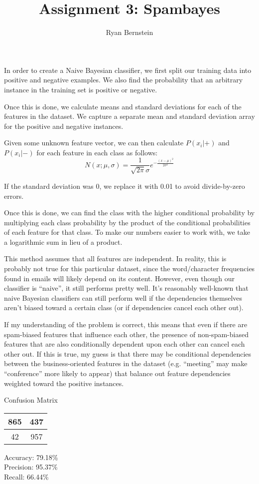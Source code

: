 \documentclass[11pt, oneside]{article}    %
\title{Assignment 3: Spambayes}
\author{Ryan Bernstein}
\date{}
\begin{document}
\maketitle

In order to create a Naive Bayesian classifier, we first split our training data into positive and negative examples. We also find the probability that an arbitrary instance in the training set is positive or negative.

Once this is done, we calculate means and standard deviations for each of the features in the dataset. We capture a separate mean and standard deviation array for the positive and negative instances.

Given some unknown feature vector, we can then calculate $P(x_{i} | +)$ and $P(x_{i} | -)$ for each feature in each class as follows:
\[
	N(x;\mu, \sigma) = \frac{1}{\sqrt{2\pi}\sigma}e^{-\frac{(x - \mu)^{2}}{2\sigma^{2}}}
\]

If the standard deviation was 0, we replace it with 0.01 to avoid divide-by-zero errors.

Once this is done, we can find the class with the higher conditional probability by multiplying each class probability by the product of the conditional probabilities of each feature for that class. To make our numbers easier to work with, we take a logarithmic sum in lieu of a product.

This method assumes that all features are independent. In reality, this is probably not true for this particular dataset, since the word/character frequencies found in emails will likely depend on its content. However, even though our classifier is ``naive'', it still performs pretty well. It's reasonably well-known that naive Bayesian classifiers can still perform well if the dependencies themselves aren't biased toward a certain class (or if dependencies cancel each other out).

If my understanding of the problem is correct, this means that even if there are spam-biased features that influence each other, the presence of non-spam-biased features that are also conditionally dependent upon each other can cancel each other out. If this is true, my guess is that there may be conditional dependencies between the business-oriented features in the dataset (e.g. ``meeting'' may make ``conference'' more likely to appear) that balance out feature dependencies weighted toward the positive instances.

\begin{center}
	Confusion Matrix
	
	\begin{tabular}{|c|c|}
		\hline
		865 & 437 \\ \hline
		42 & 957 \\
		\hline
	\end{tabular}
\end{center}

Accuracy: 79.18\% \\
Precision: 95.37\% \\
Recall: 66.44\%
\end{document}
